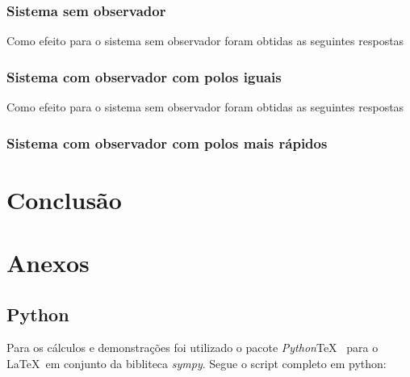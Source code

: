 \documentclass[a4paper,11pt]{article}
\begin{document}
\subsubsection{Sistema sem observador}

Como efeito para o sistema sem observador foram obtidas as seguintes respostas

\subsubsection{Sistema com observador com polos iguais}

Como efeito para o sistema sem observador foram obtidas as seguintes respostas

\subsubsection{Sistema com observador com polos mais rápidos}

\section{Conclusão}

\newpage

\nocite{sympy}
\nocite{pythontex}
\nocite{matlabcontrol}
\nocite{matlabsymbolic}
\nocite{ogata2010modern}

\newpage
\section*{Anexos}
\subsection*{Python}

Para os cálculos e demonstrações foi utilizado o pacote \textit{Python}\TeX\ \cite{pythontex} para o \LaTeX\ em conjunto da bibliteca \textit{sympy}\cite{sympy}. Segue o script completo em python:
\end{document}
